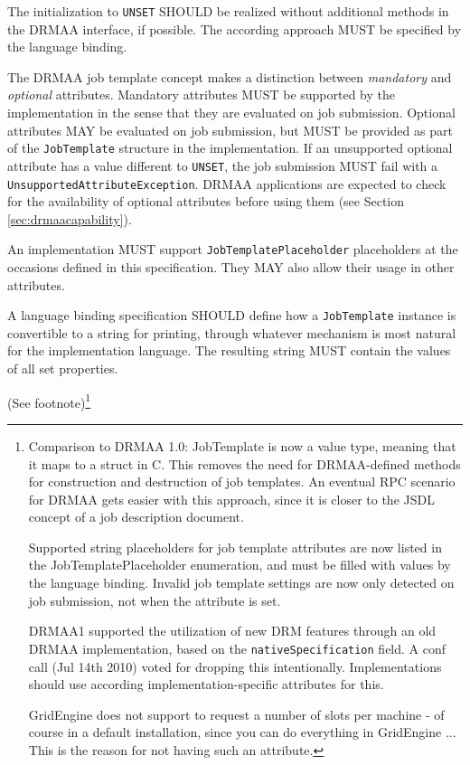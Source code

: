 \documentclass{article}
\newcommand{\h}[1]{\lstinline|#1|}
\newcommand{\langbind}[1]{\begin{shaded}#1\end{shaded}}
\newcommand{\rat}[1]{ {\tiny(See footnote)}\footnote{#1} }
\begin{document}
\langbind{
The initialization to \h{UNSET} SHOULD be realized without additional methods in the DRMAA interface, if possible. The according approach MUST be specified by the language binding. 
}

The DRMAA job template concept makes a distinction between \emph{mandatory} and \emph{optional} attributes. Mandatory attributes MUST be supported by the implementation in the sense that they are evaluated on job submission. Optional attributes MAY be evaluated on job submission, but MUST be provided as part of the \h{JobTemplate} structure in the implementation. If an unsupported optional attribute has a value different to \h{UNSET}, the job submission MUST fail with a \h{UnsupportedAttributeException}. DRMAA applications are expected to check for the availability of optional attributes before using them (see Section \ref{sec:drmaacapability}).

An implementation MUST support \h{JobTemplatePlaceholder} placeholders at the occasions defined in this specification. They MAY also allow their usage in other attributes.

\langbind{
A language binding specification SHOULD define how a \h{JobTemplate} instance is convertible to a string for printing, through whatever mechanism is most natural for the implementation language. The resulting string MUST contain the values of all set properties.
}

\rat{
Comparison to DRMAA 1.0: JobTemplate is now a value type, meaning that it maps to a struct in C. This removes the need for DRMAA-defined methods for construction and destruction of job templates. An eventual RPC scenario for DRMAA gets easier with this approach, since it is closer to the JSDL concept of a job description document. 

Supported string placeholders for job template attributes are now listed in the JobTemplatePlaceholder enumeration, and must be filled with values by the language binding. Invalid job template settings are now only detected on job submission, not when the attribute is set. 

DRMAA1 supported the utilization of new DRM features through an old DRMAA implementation, based on the \h{nativeSpecification} field. A conf call (Jul 14th 2010) voted for dropping this intentionally. Implementations should use according implementation-specific attributes for this.

GridEngine does not support to request a number of slots per machine - of course in a default installation, since you can do everything in GridEngine ... This is the reason for not having such an attribute.
}
\end{document}
